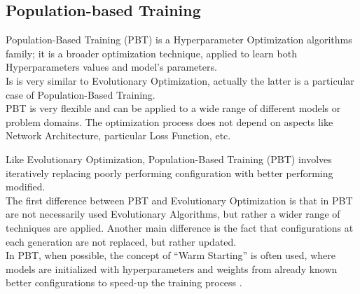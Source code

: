 \subsection{Population-based Training}

Population-Based Training (PBT) is a Hyperparameter Optimization algorithms family; it is a broader optimization technique, applied to learn both Hyperparameters values and model's parameters.
\\[0.3cm]Is is very similar to Evolutionary Optimization, actually the latter is a particular case of Population-Based Training.
\\[0.3cm]PBT is very flexible and can be applied to a wide range of different models or problem domains. The optimization process does not depend on aspects like Network Architecture, particular Loss Function, etc.

Like Evolutionary Optimization, Population-Based Training (PBT) involves iteratively replacing poorly performing configuration with better performing modified.
\\[0.3cm]The first difference between PBT and Evolutionary Optimization is that in PBT are not necessarily used Evolutionary Algorithms, but rather a wider range of techniques are applied.
Another main difference is the fact that configurations at each generation are not replaced, but rather updated.
\\[0.3cm]In PBT, when possible, the concept of “Warm Starting” is often used, where models are initialized with hyperparameters and weights from already known better configurations to speed-up the training process \cite{Tesi-1.1}.


